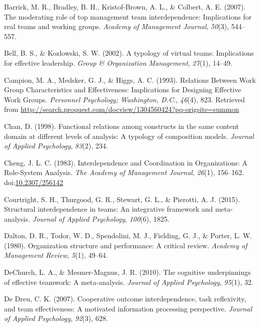 \documentclass[english,,man]{apa6}
\theoremstyle{definition}
\theoremstyle{definition}
\theoremstyle{definition}
\theoremstyle{remark}
\begin{document}
\leavevmode\hypertarget{ref-barrick_moderating_2007}{}%
Barrick, M. R., Bradley, B. H., Kristof-Brown, A. L., \& Colbert, A. E.
(2007). The moderating role of top management team interdependence:
Implications for real teams and working groups. \emph{Academy of
Management Journal}, \emph{50}(3), 544--557.

\leavevmode\hypertarget{ref-bell_typology_2002}{}%
Bell, B. S., \& Kozlowski, S. W. (2002). A typology of virtual teams:
Implications for effective leadership. \emph{Group \& Organization
Management}, \emph{27}(1), 14--49.

\leavevmode\hypertarget{ref-campion_relations_1993}{}%
Campion, M. A., Medsker, G. J., \& Higgs, A. C. (1993). Relations
Between Work Group Characteristics and Effectiveness: Implications for
Designing Effective Work Groups. \emph{Personnel Psychology; Washington,
D.C.}, \emph{46}(4), 823. Retrieved from
\url{http://search.proquest.com/docview/1304560424?pq-origsite=summon}

\leavevmode\hypertarget{ref-chan_functional_1998}{}%
Chan, D. (1998). Functional relations among constructs in the same
content domain at different levels of analysis: A typology of
composition models. \emph{Journal of Applied Psychology}, \emph{83}(2),
234.

\leavevmode\hypertarget{ref-cheng_interdependence_1983}{}%
Cheng, J. L. C. (1983). Interdependence and Coordination in
Organizations: A Role-System Analysis. \emph{The Academy of Management
Journal}, \emph{26}(1), 156--162.
doi:\href{https://doi.org/10.2307/256142}{10.2307/256142}

\leavevmode\hypertarget{ref-courtright_structural_2015}{}%
Courtright, S. H., Thurgood, G. R., Stewart, G. L., \& Pierotti, A. J.
(2015). Structural interdependence in teams: An integrative framework
and meta-analysis. \emph{Journal of Applied Psychology}, \emph{100}(6),
1825.

\leavevmode\hypertarget{ref-dalton_organization_1980}{}%
Dalton, D. R., Todor, W. D., Spendolini, M. J., Fielding, G. J., \&
Porter, L. W. (1980). Organization structure and performance: A critical
review. \emph{Academy of Management Review}, \emph{5}(1), 49--64.

\leavevmode\hypertarget{ref-dechurch2010cognitive}{}%
DeChurch, L. A., \& Mesmer-Magnus, J. R. (2010). The cognitive
underpinnings of effective teamwork: A meta-analysis. \emph{Journal of
Applied Psychology}, \emph{95}(1), 32.

\leavevmode\hypertarget{ref-de_dreu_cooperative_2007}{}%
De Dreu, C. K. (2007). Cooperative outcome interdependence, task
reflexivity, and team effectiveness: A motivated information processing
perspective. \emph{Journal of Applied Psychology}, \emph{92}(3), 628.
\end{document}
